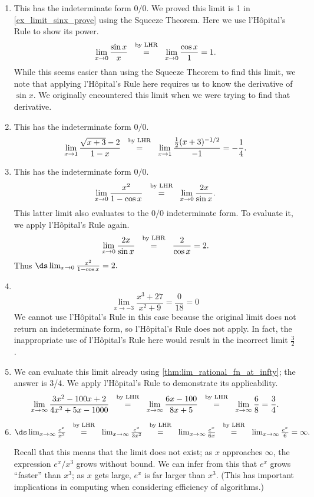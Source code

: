 {\begin{enumerate}
	\item	This has the indeterminate form $0/0$. We proved this limit is 1 in \autoref{ex_limit_sinx_prove} using the Squeeze Theorem. Here we use l'H\^opital's Rule to show its power.
$$\lim_{x\to0}\frac{\sin x}x \stackrel{\ \text{ by LHR \rule[-5pt]{0pt}{3pt}} \ }{=} \lim_{x\to0} \frac{\cos x}{1}=1.$$
While this seems easier than using the Squeeze Theorem to find this limit, we note that applying l'H\^opital's Rule here requires us to know the derivative of $\sin x$. We originally encountered this limit when we were trying to find that derivative.

	\item	This has the indeterminate form $0/0$.
\[\lim_{x\to 1}\frac{\sqrt{x+3}-2}{1-x} 	 \stackrel{\ \text{ by LHR \rule[-5pt]{0pt}{3pt}} \ }{=} \lim_{x \to 1} \frac{\frac12(x+3)^{-1/2}}{-1} =-\frac 14.\]

	\item	This has the indeterminate form $0/0$.
\[\lim_{x\to 0}\frac{x^2}{1-\cos x}  \stackrel{\ \text{ by LHR \rule[-5pt]{0pt}{3pt}} \ }{=}  \lim_{x\to 0} \frac{2x}{\sin x}.\]
This latter limit also evaluates to the $0/0$ indeterminate form. To evaluate it, we apply l'H\^opital's Rule again.
\[
 \lim_{x\to 0} \frac{2x}{\sin x}
 \stackrel{\ \text{ by LHR \rule[-5pt]{0pt}{3pt}} \ }{=} \frac{2}{\cos x} = 2 .
\]
Thus $\ds \lim_{x\to0}\frac{x^2}{1-\cos x}=2.$

	\item \mbox{}\\[-2\baselineskip]
\[\lim_{x\to-3}\frac{x^3+27}{x^2+9} =\frac 0{18}=0\]
We cannot use l'H\^opital's Rule in this case because the original limit does not return an indeterminate form, so l'H\^opital's Rule does not apply. In fact, the inappropriate use of l'H\^opital's Rule here would result in the incorrect limit $\frac32$.

	\item	We can evaluate this limit already using \autoref{thm:lim_rational_fn_at_infty}; the answer is 3/4. We apply l'H\^opital's Rule to demonstrate its applicability.
$$\lim_{x\to\infty} \frac{3x^2-100x+2}{4x^2+5x-1000}\stackrel{\ \text{ by LHR \rule[-5pt]{0pt}{3pt}} \ }{=} \lim_{x\to\infty} \frac{6x-100}{8x+5} \stackrel{\ \text{ by LHR \rule[-5pt]{0pt}{3pt}} \ }{=} \lim_{x\to\infty} \frac68 = \frac34.$$

	\item	$\ds\lim_{x\to \infty}\frac{e^x}{x^3} \stackrel{\ \text{ by LHR \rule[-5pt]{0pt}{3pt}} \ }{=} \lim_{x\to\infty} \frac{e^x}{3x^2} \stackrel{\ \text{ by LHR \rule[-5pt]{0pt}{3pt}} \ }{=} \lim_{x\to\infty} \frac{e^x}{6x} \stackrel{\ \text{ by LHR \rule[-5pt]{0pt}{3pt}} \ }{=} \lim_{x\to\infty} \frac{e^x}{6} = \infty.$

Recall that this means that the limit does not exist; as $x$ approaches $\infty$, the expression $e^x/x^3$ grows without bound. We can infer from this that $e^x$ grows ``faster'' than $x^3$; as $x$ gets large, $e^x$ is far larger than $x^3$. (This has important implications in computing when considering efficiency of algorithms.)\eoehere
\end{enumerate}}


